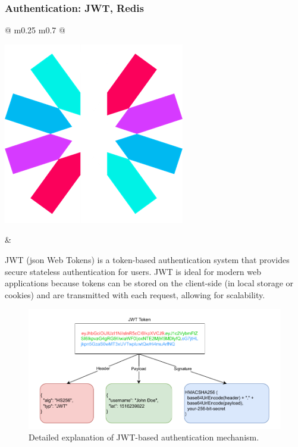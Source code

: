 	\subsubsection{Authentication: JWT, Redis}
	\vspace*{0.5cm}
	\begin{tabular}{ @{} m{0.25\textwidth} m{0.7\textwidth} @{} }
		\begin{minipage}{\linewidth}
			\centering
			\includegraphics[width=0.5\linewidth]{graphics/jwt-logo.png}
			\label{fig:jwt }
		\end{minipage}
		&
		\begin{minipage}{\linewidth}
			JWT (\acs{json} Web Tokens) is a token-based authentication system that provides secure stateless authentication for users. JWT is ideal for modern web applications because tokens can be stored on the client-side (in local storage or cookies) and are transmitted with each request, allowing for scalability. \cite{jwt}
		\end{minipage}
	\end{tabular}
	
	\begin{figure}[H]
		\centering
		\includegraphics[width=1.1\columnwidth]{graphics/jwt-explained.pdf}
		\caption{Detailed explanation of JWT-based authentication mechanism.}
		\label{fig:jwt-explained}
	\end{figure}
	

